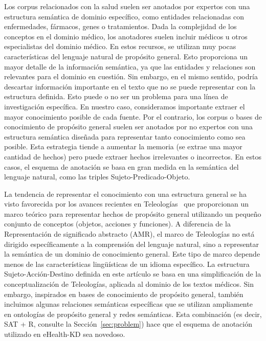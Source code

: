 Los corpus relacionados con la salud suelen ser anotados por expertos con una estructura semántica de dominio específico, como entidades relacionadas con enfermedades, fármacos, genes o tratamientos. Dada la complejidad de los conceptos en el dominio médico, los anotadores suelen incluir médicos u otros especialistas del dominio médico. En estos recursos, se utilizan muy pocas características del lenguaje natural de propósito general. Esto proporciona un mayor detalle de la información semántica, ya que las entidades y relaciones son relevantes para el dominio en cuestión. Sin embargo, en el mismo sentido, podría descartar información importante en el texto que no se puede representar con la estructura definida. Esto puede o no ser un problema para una línea de investigación específica. En nuestro caso, consideramos importante extraer el mayor conocimiento posible de cada fuente. Por el contrario, los corpus o bases de conocimiento de propósito general suelen ser anotados por no expertos con una estructura semántica diseñada para representar tanto conocimiento como sea posible. Esta estrategia tiende a aumentar la memoria (se extrae una mayor cantidad de hechos) pero puede extraer hechos irrelevantes o incorrectos. En estos casos, el esquema de anotación se basa en gran medida en la semántica del lenguaje natural, como las triples Sujeto-Predicado-Objeto.

La tendencia de representar el conocimiento con una estructura general se ha visto favorecida por los avances recientes en Teleologías~\cite{teleologies} que proporcionan un marco teórico para representar hechos de propósito general utilizando un pequeño conjunto de conceptos (objetos, acciones y funciones). A diferencia de la Representación de significado abstracto (AMR), el marco de Teleologías no está dirigido específicamente a la comprensión del lenguaje natural, sino a representar la semántica de un dominio de conocimiento general. Este tipo de marco depende menos de las características lingüísticas de un idioma específico. La estructura Sujeto-Acción-Destino definida en este artículo se basa en una simplificación de la conceptualización de Teleologías, aplicada al dominio de los textos médicos. Sin embargo, inspirados en bases de conocimiento de propósito general, también incluimos algunas relaciones semánticas específicas que se utilizan ampliamente en ontologías de propósito general y redes semánticas. Esta combinación (es decir, SAT + R, consulte la Sección~\ref{sec:problem}) hace que el esquema de anotación utilizado en eHealth-KD sea novedoso.

